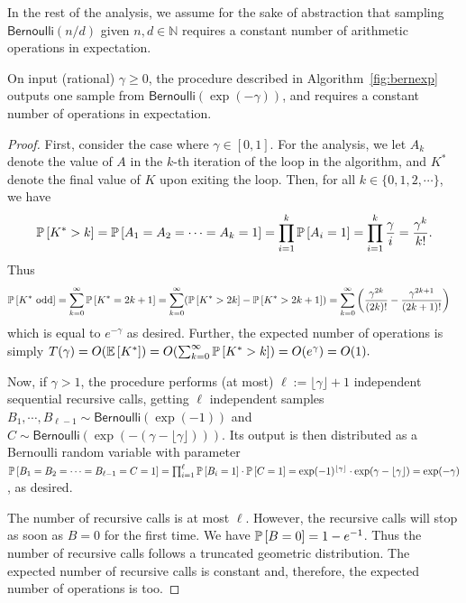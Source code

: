 \documentclass{jpcfinal} %
\newcommand{\ex}[2]{{\ifx&#1& \mathbb{E} \else
\underset{#1}{\mathbb{E}} \fi \left[#2\right]}}
\newcommand{\pr}[2]{{\ifx&#1& \mathbb{P} \else
\underset{#1}{\mathbb{P}} \fi \left[#2\right]}}
\newcommand{\eqdef}{:=}
\newcommand{\bern}{\mathsf{Bernoulli}}
\begin{document}
In the rest of the analysis, we assume for the sake of abstraction that sampling $\bern(n/d)$ given $n,d \in \mathbb{N}$ requires a constant number of arithmetic operations in expectation.
\begin{prop}
  \label{prop:sampling:expbernoulli}
  On input (rational) $\gamma\geq 0$, the procedure described in Algorithm~\ref{fig:bernexp} outputs one sample from $\bern(\exp(-\gamma))$, and requires a constant number of operations in expectation.
\end{prop}
\begin{proof}
    First, consider the case where $\gamma\in[0,1]$. For the analysis, we let $A_k$ denote the value of $A$ in the $k$-th iteration of the loop in the algorithm, and $K^\ast$ denote the final value of $K$ upon exiting the loop. Then, for all $k \in \{0,1,2,\cdots\}$, we have 
    \[
      \pr{}{K^\ast > k} = \pr{}{A_1=A_2=\cdots=A_k=1} = \prod_{i=1}^k \pr{}{A_i=1} = \prod_{i=1}^k \frac{\gamma}{i} = \frac{\gamma^k}{k!}.
    \]
    Thus
    \begin{align*}
    \pr{}{K^\ast~\text{odd}} &= \sum_{k=0}^\infty \pr{}{K^\ast=2k+1}
    = \sum_{k=0}^\infty ( \pr{}{K^\ast>2k} - \pr{}{K^\ast>2k+1} )
    = \sum_{k=0}^\infty \left( \frac{\gamma^{2k}}{(2k)!} - \frac{\gamma^{2k+1}}{(2k+1)!} \right)
    \end{align*}
    which is equal to $e^{-\gamma}$ as desired. Further, the expected number of operations is simply 
    $
    T(\gamma)=O(\ex{}{K^\ast}) = O\!\left(\sum_{k=0}^\infty \pr{}{K^\ast > k}\right) = O(e^\gamma) = O(1).
    $\smallskip


    Now, if $\gamma > 1$, the procedure performs (at most) $\ell \eqdef  \lfloor \gamma \rfloor + 1$ independent sequential recursive calls, getting $\ell$ independent samples $B_1,\cdots,B_{\ell-1}\sim\bern(\exp(-1))$ and $C\sim\bern(\exp(-(\gamma-\lfloor\gamma\rfloor)))$. Its output is then distributed as a Bernoulli random variable with parameter\\$\pr{}{B_1=B_2=\cdots=B_{\ell-1}=C=1} = \prod_{i=1}^\ell\pr{}{B_i=1} \cdot \pr{}{C=1} = \exp(-1)^{\lfloor \gamma \rfloor} \cdot \exp(\gamma-\lfloor\gamma\rfloor) = \exp(-\gamma)$, as desired.
    
    The number of recursive calls is at most $\ell$. However, the recursive calls will stop as soon as $B=0$ for the first time. We have $\pr{}{B=0} = 1-e^{-1}$. Thus the number of recursive calls follows a truncated geometric distribution. The expected number of recursive calls is constant and, therefore, the expected number of operations is too.
\end{proof}
\end{document}
